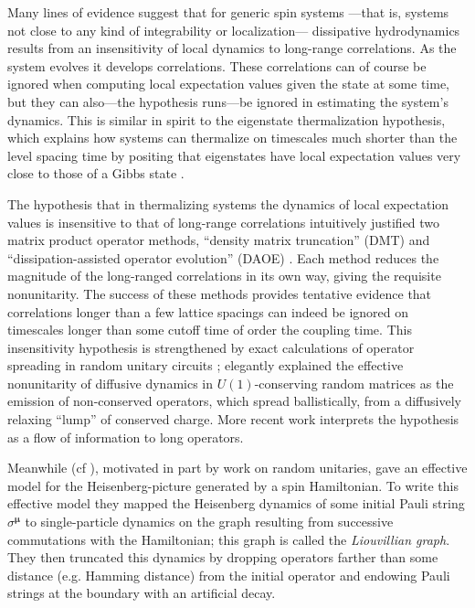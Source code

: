 \documentclass[aps,prb,nofootinbib,twocolumn,balancelastpage,amsmath,amssymb,floatfix,superscriptaddress,]{revtex4-1}
\begin{document}
Many lines of evidence suggest that for generic spin systems%
---that is, systems not close to any kind of integrability or localization---%
dissipative hydrodynamics results from an insensitivity of local dynamics to long-range correlations.
As the system evolves it develops correlations.
These correlations can of course be ignored when computing local expectation values given the state at some time,
but they can also---the hypothesis runs---be ignored in estimating the system's dynamics.
This is similar in spirit to the eigenstate thermalization hypothesis,
which explains how systems can thermalize on timescales much shorter than the level spacing time
by positing that eigenstates have local expectation values very close to those of a Gibbs state \cite{deutsch_quantum_1991,srednicki_chaos_1994,srednicki_chaos_1994,dalessio_quantum_2016}.

The hypothesis that in thermalizing systems
the dynamics of local expectation values is insensitive to that of long-range correlations
intuitively justified
two matrix product operator methods, ``density matrix truncation'' (DMT) \cite{white_quantum_2018,ye_emergent_2019} and ``dissipation-assisted operator evolution'' (DAOE) \cite{rakovszky_dissipation-assisted_2020}.
Each method reduces the magnitude of the long-ranged correlations in its own way,
giving the requisite nonunitarity.
The success of these methods
provides tentative evidence that
correlations longer than a few lattice spacings can indeed be ignored on timescales longer than some cutoff time of order the coupling time.
This insensitivity hypothesis is strengthened by exact calculations of operator spreading in random unitary circuits \cite{ho_entanglement_2017,von_keyserlingk_operator_2018,nahum_quantum_2017,khemani_operator_2018,rakovszky_diffusive_2017}; 
 elegantly explained the effective nonunitarity of diffusive dynamics in $U(1)$-conserving random matrices
as the emission of non-conserved operators,
which spread ballistically,
from a diffusively relaxing ``lump'' of conserved charge.
More recent work interprets the hypothesis as a flow of information to long operators.\cite{kvorning_time-evolution_2021}

Meanwhile  (cf ),
motivated in part by work on random unitaries,
gave an effective model for the Heisenberg-picture generated by a spin Hamiltonian.
To write this effective model they mapped the Heisenberg dynamics
of some initial Pauli string $\sigma^{\bm \mu}$
to single-particle dynamics on
the graph resulting from successive commutations with the Hamiltonian;
this graph is called the \textit{Liouvillian graph}.
They then truncated this dynamics
by dropping operators farther than some distance (e.g. Hamming distance)
from the initial operator
and endowing Pauli strings at the boundary with an artificial decay.
\end{document}
